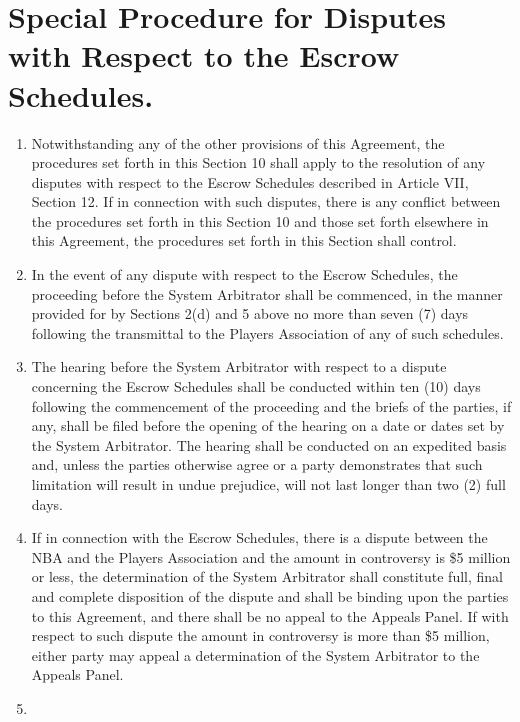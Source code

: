 \documentclass[
]{book}
\providecommand{\tightlist}{%
  \setlength{\itemsep}{0pt}\setlength{\parskip}{0pt}}
\begin{document}
\hypertarget{special-procedure-for-disputes-with-respect-to-the-escrow-schedules.}{%
\section{Special Procedure for Disputes with Respect to the Escrow Schedules.}\label{special-procedure-for-disputes-with-respect-to-the-escrow-schedules.}}

\begin{enumerate}
\def\labelenumi{(\alph{enumi})}
\tightlist
\item
  Notwithstanding any of the other provisions of this Agreement, the procedures set forth in this Section 10 shall apply to the resolution of any disputes with respect to the Escrow Schedules described in Article VII, Section 12. If in connection with such disputes, there is any conflict between the procedures set forth in this Section 10 and those set forth elsewhere in this Agreement, the procedures set forth in this Section shall control.
\item
  In the event of any dispute with respect to the Escrow Schedules, the proceeding before the System Arbitrator shall be commenced, in the manner provided for by Sections 2(d) and 5 above no more than seven (7) days following the transmittal to the Players Association of any of such schedules.
\item
  The hearing before the System Arbitrator with respect to a dispute concerning the Escrow Schedules shall be conducted within ten (10) days following the commencement of the proceeding and the briefs of the parties, if any, shall be filed before the opening of the hearing on a date or dates set by the System Arbitrator. The hearing shall be conducted on an expedited basis and, unless the parties otherwise agree or a party demonstrates that such limitation will result in undue prejudice, will not last longer than two (2) full days.
\item
  If in connection with the Escrow Schedules, there is a dispute between the NBA and the Players Association and the amount in controversy is \$5 million or less, the determination of the System Arbitrator shall constitute full, final and complete disposition of the dispute and shall be binding upon the parties to this Agreement, and there shall be no appeal to the Appeals Panel. If with respect to such dispute the amount in controversy is more than \$5 million, either party may appeal a determination of the System Arbitrator to the Appeals Panel.
\item

\end{enumerate}
\end{document}

